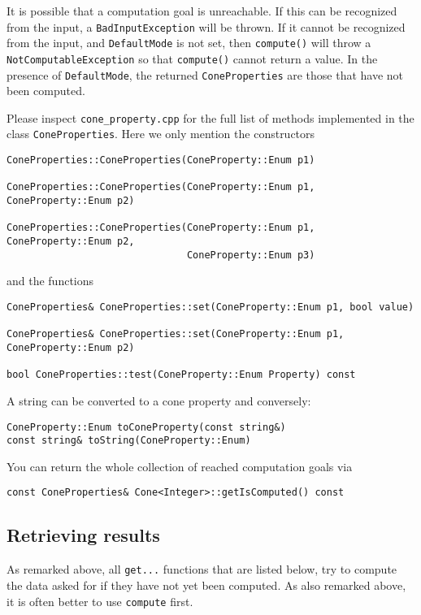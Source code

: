 \begin{small}
It is possible that a computation goal is unreachable. If this can be recognized from the input, a \verb|BadInputException| will be thrown. If it cannot be recognized from the input, and \verb|DefaultMode| is not set, then \verb|compute()| will throw a \verb|NotComputableException| so that \verb|compute()| cannot return a value. In the presence of \verb|DefaultMode|, the returned \verb|ConeProperties| are those that have not been computed.

Please inspect \verb|cone_property.cpp| for the full list of methods implemented in the class \verb|ConeProperties|. Here we only mention the constructors
\begin{Verbatim}
ConeProperties::ConeProperties(ConeProperty::Enum p1)

ConeProperties::ConeProperties(ConeProperty::Enum p1, ConeProperty::Enum p2)

ConeProperties::ConeProperties(ConeProperty::Enum p1, ConeProperty::Enum p2,
                               ConeProperty::Enum p3)
\end{Verbatim}
and the functions
\begin{Verbatim}
ConeProperties& ConeProperties::set(ConeProperty::Enum p1, bool value)

ConeProperties& ConeProperties::set(ConeProperty::Enum p1, ConeProperty::Enum p2)

bool ConeProperties::test(ConeProperty::Enum Property) const
\end{Verbatim}

A string can be converted to a cone property and conversely:
\begin{Verbatim}
ConeProperty::Enum toConeProperty(const string&)
const string& toString(ConeProperty::Enum)
\end{Verbatim}

You can return the whole collection of reached computation goals via
\begin{Verbatim}
const ConeProperties& Cone<Integer>::getIsComputed() const
\end{Verbatim}



\subsection{Retrieving results}

As remarked above, all \verb|get...| functions that are listed below, try to compute the data asked for if they have not yet been computed. As also remarked above, it is often better to use \verb|compute| first.


\end{small}
